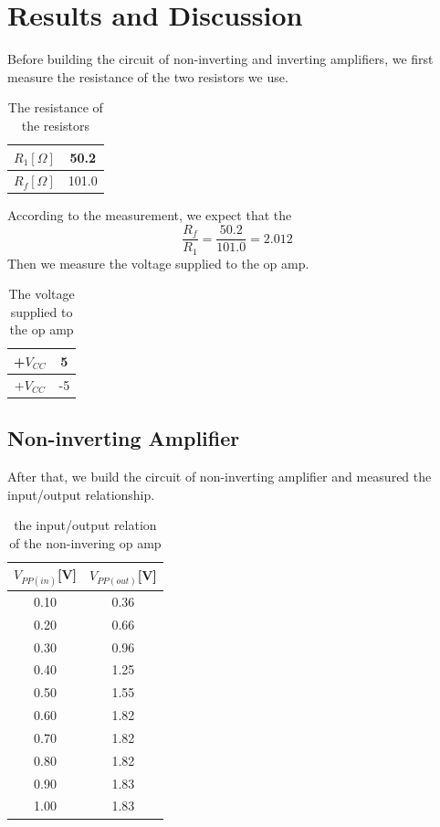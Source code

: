 \documentclass[12pt,a4paper]{article}
\begin{document}
\section{Results and Discussion}
Before building the circuit of non-inverting and inverting amplifiers, we first measure the resistance of the two resistors we use.
\begin{table}[htp]
\centering
\begin{tabular}{|c|c|}
\hline
$R_1[\Omega ]$ & 50.2  \\ \hline
$R_f[\Omega ]$ & 101.0 \\ \hline
\end{tabular}
\caption{The resistance of the resistors}
\end{table}
According to the measurement, we expect that the $$\frac{R_f}{R_1} = \frac{50.2}{101.0} = 2.012$$
Then we measure the voltage supplied to the op amp.
\begin{table}[htp]
\centering
\begin{tabular}{|c|c|}
\hline
+$V_{CC}$ & 5  \\ \hline
+$V_{CC}$ & -5 \\ \hline
\end{tabular}
\caption{The voltage supplied to the op amp}
\end{table}
\subsection{Non-inverting Amplifier}
After that, we build the circuit of non-inverting amplifier and measured the input/output relationship.
\begin{table}[htp]
\centering
\begin{tabular}{|c|c|}
\hline
$V_{PP(in)}${[}V{]} & $V_{PP(out)}${[}V{]} \\ \hline
0.10                & 0.36                 \\ \hline
0.20                & 0.66                 \\ \hline
0.30                & 0.96                 \\ \hline
0.40                & 1.25                 \\ \hline
0.50                & 1.55                 \\ \hline
0.60                & 1.82                 \\ \hline
0.70                & 1.82                 \\ \hline
0.80                & 1.82                 \\ \hline
0.90                & 1.83                 \\ \hline
1.00                & 1.83                 \\ \hline
\end{tabular}
\caption{the input/output relation of the non-invering op amp}
\end{table}
\end{document}
